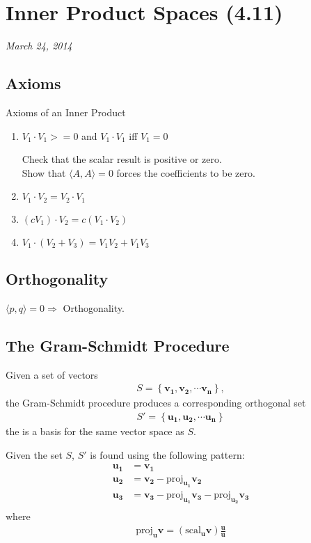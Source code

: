 \documentclass[a4paper,10pt]{report}
\begin{document}
\section{Inner Product Spaces (4.11)}
\textit{March 24, 2014}\\

\subsection{Axioms}
 Axioms of an Inner Product
\begin{enumerate}
  \item $V_1 \cdot V_1 >= 0$ and $V_1\cdot V_1$ iff $V_1 = 0$

    Check that the scalar result is positive or zero.\\
    Show that $\langle A,A\rangle = 0$ forces the coefficients to be zero.
  \item $V_1 \cdot V_2 = V_2 \cdot V_1$
  \item $(cV_1)\cdot V_2 = c(V_1\cdot V_2)$
  \item $V_1 \cdot (V_2 + V_3) = V_1 V_2 + V_1 V_3$
\end{enumerate}

\subsection{Orthogonality}
$\langle p,q\rangle =0 \Rightarrow$ Orthogonality.

\subsection{The Gram-Schmidt Procedure}
Given a set of vectors
\begin{align*}
 S = \left\{\mathbf{v_1, v_2, \cdots v_n}\right\},
\end{align*}
the Gram-Schmidt procedure produces a corresponding orthogonal set
\begin{align*}
 S' = \left\{\mathbf{u_1, u_2, \cdots u_n}\right\}
\end{align*}
the is a basis for the same vector space as $S$.

Given the set $S$, $S'$ is found using the following pattern:
\begin{align*}
 \mathbf{u_1} &= \mathbf{v_1} \\
 \mathbf{u_2} &= \mathbf{v_2} - \text{proj}_{\mathbf{u_1}} \mathbf{v_2}\\
 \mathbf{u_3} &= \mathbf{v_3} - \text{proj}_{\mathbf{u_1}} \mathbf{v_3} - \text{proj}_{\mathbf{u_2}} \mathbf{v_3}\\
\end{align*}
where
\begin{align*}
 \text{proj}_{\mathbf{u}} \mathbf{v} = (\text{scal}_{\mathbf{u}} \mathbf{v})\frac{\mathbf{u}}{\mathbf{u}}
\end{align*}
\end{document}
